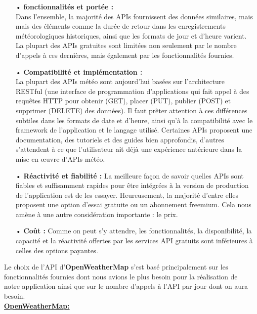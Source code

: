 \documentclass[12pt, french]{article}
\begin{document}
        \begin{itemize}
            \item[•] \textbf{fonctionnalités et portée :}~~\\
            Dans l'ensemble, la majorité des APIs  fournissent des données similaires, mais mais des éléments comme la durée de retour dans les enregistrements météorologiques historiques, ainsi que les formats de jour et d'heure varient.
            La plupart des APIs gratuites sont limitées non seulement par le nombre d'appels à ces dernières, mais également par les fonctionnalités fournies.\newline 
            \item[•] \textbf{Compatibilité et implémentation :}~~\\
            La plupart des APIs météo sont aujourd'hui basées sur l'architecture RESTful (une interface de programmation d'applications qui fait appel à des requêtes HTTP pour obtenir (GET), placer (PUT), publier (POST) et supprimer (DELETE) des données). Il faut prêter attention à ces différences subtiles dans les formats de date et d'heure, ainsi qu'à la compatibilité avec le framework de l'application et le langage utilisé.\newline
            Certaines APIs proposent une documentation, des tutoriels et des guides bien  approfondis, d'autres s'attendent à ce que l’utilisateur ait déjà une expérience antérieure dans la mise en œuvre d'APIs météo.\newline
            \item[•] \textbf{Réactivité et fiabilité :}
            La meilleure façon de savoir quelles APIs sont fiables et suffisamment rapides pour être intégrées à la version de production de l’application est de les essayer. Heureusement, la majorité d'entre elles proposent une option d'essai gratuite ou un abonnement freemium. Cela nous amène à une autre considération importante : le prix.\newline\\
            \item[•] \textbf{Coût :}
            Comme on peut s'y attendre, les fonctionnalités, la disponibilité, la capacité et la réactivité offertes par les services API gratuits sont inférieures à celles des options payantes.\newline
    
        \end{itemize}
            Le choix de l'API d'\textbf{OpenWeatherMap} \cite{OpenWeatherMap}  s’est basé principalement sur les fonctionnalités fournies dont nous avions le plus besoin pour la réalisation de  notre application ainsi que sur le nombre d’appels à l'API par jour dont on aura besoin.\newline~~\\
        \textbf{\underline{OpenWeatherMap:}}\newline
        
\end{document}
